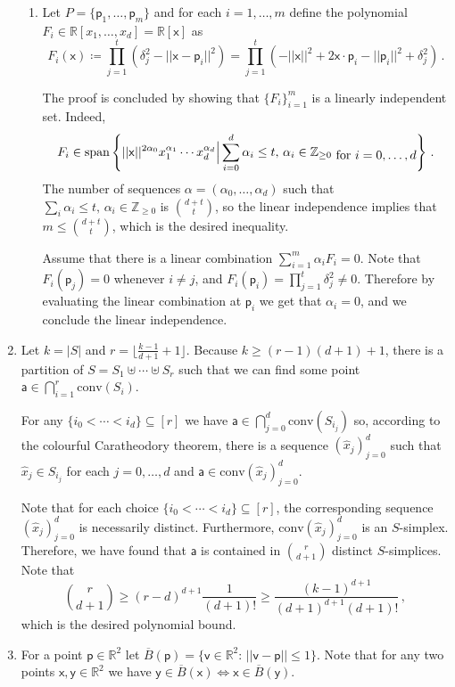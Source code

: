 \documentclass[kulak]{tplt}
\theoremstyle{definition}
\newcommand{\R}{\mathbb{R}}
\newcommand{\Z}{\mathbb{Z}}
\newcommand{\vv}{\mathsf{v}}
\newcommand{\vx}{\mathsf{x}}
\newcommand{\vy}{\mathsf{y}}
\newcommand{\va}{\mathsf{a}}
\newcommand{\vp}{\mathsf{p}}
\newcommand{\spn}{\mathrm{span}}
\newcommand{\conv}{\mathrm{conv}}
\begin{document}
\begin{enumerate}
\begin{enumerate}
\item 
Let $P = \{\vp_1, \ldots, \vp_m \} $ and for each $i=1, \ldots, m$ define the polynomial $F_i \in \R[x_1, \ldots, x_d] = \R[\vx]$ as
$$ F_i ( \vx ) \coloneqq \prod_{j=1}^t \left( \delta_j^2 - ||\vx - \vp_i ||^2\right)  =  \prod_{j=1}^t \left(  - ||\vx ||^2 + 2 \vx \cdot \vp_i - ||\vp_i||^2 + \delta_j^2\right) \, .$$


The proof is concluded by showing that $\{F_i\}_{i=1}^m$ is a linearly independent set.
Indeed, 
$$F_i \in \spn \left\{ ||\vx||^{2\alpha_0} x_1^{\alpha_1} \cdots x_d^{\alpha_d}\Big| \sum_{i=0}^d \alpha_i \leq t, \, \alpha_i\in \Z_{\geq 0 } \txt{ for $i = 0 , \ldots, d $ }\right\}\, . $$
The number of sequences $\alpha = (\alpha_0, \ldots, \alpha_d)$ such that $ \sum_i \alpha_i \leq t, \, \alpha_i\in \Z_{\geq 0 }$ is $\binom{d+t}{t}$, so the linear independence implies that $m \leq \binom{d+t}{t}$, which is the desired inequality.

Assume that there is a linear combination $ \sum_{i=1}^m \alpha_i F_i = 0 $.
Note that $F_i(\vp_j ) = 0$ whenever $i \neq j$, and $F_i(\vp_i ) = \prod_{j=1}^t \delta_j^2 \neq 0$.
Therefore by evaluating the linear combination at $\vp_i $ we get that $\alpha_i =0$, and we conclude the linear independence.
\end{enumerate}

\item 
Let $k = |S|$ and $r = \lfloor \frac{k-1}{d+1} + 1 \rfloor$.
Because $k \geq (r-1)(d+1) + 1$, there is a partition of $S = S_1 \uplus \cdots \uplus S_r$ such that we can find some point $\va \in \bigcap_{i=1}^r \conv (S_i)$.

For any $\{i_0 < \cdots < i_d\} \subseteq [r]$ we have $\va \in \bigcap_{j=0}^d \conv (S_{i_j})$ so, according to the colourful Caratheodory theorem, there is a sequence $(\hat{x}_j)_{j=0}^d$ such that $\hat{x}_j\in S_{i_j} $ for each $j = 0, \ldots, d$ and $\va \in \conv (\hat{x}_j)_{j=0}^d$.

Note that for each choice $\{i_0 < \cdots < i_d\} \subseteq [r]$, the corresponding sequence $(\hat{x}_j)_{j=0}^d$ is necessarily distinct.
Furthermore, $\conv (\hat{x}_j)_{j=0}^d $ is an $S$-simplex.
Therefore, we have found that $\va $ is contained in $\binom{r}{d+1}$ distinct $S$-simplices.
Note that 
$$\binom{r}{d+1} \geq (r-d)^{d+1}\frac{1}{(d+1)!} \geq \frac{(k-1)^{d+1}}{(d+1)^{d+1} (d+1)!} \, ,$$
which is the desired polynomial bound.

\item 
For a point $\vp \in \R^2$ let $\overline{B}(\vp) = \{ \vv \in \R^2 : \, ||\vv - \vp|| \leq 1 \}$.
Note that for any two points $\vx, \vy \in \R^2$ we have $\vy \in \overline{B}(\vx) \Leftrightarrow \vx \in \overline{B}(\vy)$.


\end{enumerate}
\end{document}
